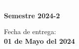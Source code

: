\begin{titlepage}
\vspace{20mm}

\begin{minipage}{0.4\textwidth}
    \textcolor{white}{Semestre}\\
    \large\textbf{Semestre 2024-2}      
\end{minipage}
\begin{minipage}{0.4\textwidth}
    \begin{flushright}
        {\large Fecha de entrega:\\
         \textbf{01 de Mayo del 2024}}
    \end{flushright}
\end{minipage}

\makeatother

\vfill 
\end{titlepage}

